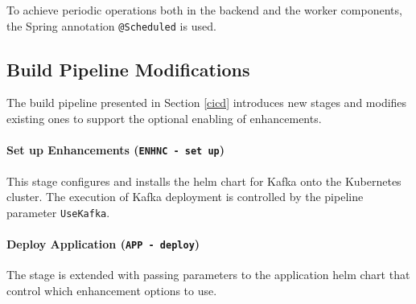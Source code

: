 To achieve periodic operations both in the backend and the worker components, the Spring annotation \texttt{@Scheduled} is used.


\subsection{Build Pipeline Modifications} \label{cicd-modifications}

The build pipeline presented in Section \ref{cicd} introduces new stages and modifies existing ones to support the optional enabling of enhancements.

\paragraph{Set up Enhancements (\texttt{ENHNC - set up})} This stage configures and installs the helm chart for Kafka onto the Kubernetes cluster. The execution of Kafka deployment is controlled by the pipeline parameter \texttt{UseKafka}.

\paragraph{Deploy Application (\texttt{APP - deploy})} The stage is extended with passing parameters to the application helm chart that control which enhancement options to use.




